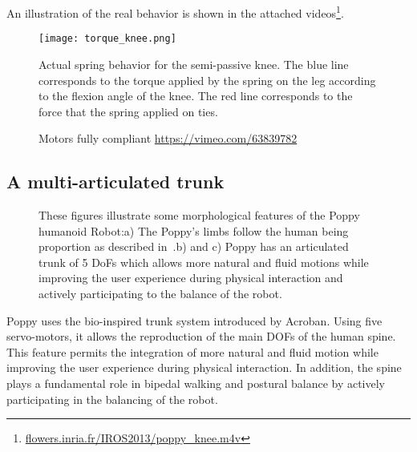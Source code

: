 An illustration of the real behavior is shown in the attached videos\footnote{\url{flowers.inria.fr/IROS2013/poppy_knee.m4v}}.

\begin{figure}[thpb]
    \centering
    \texttt{[image: torque\_knee.png]}
    \caption{Actual spring behavior for the semi-passive knee. The blue line corresponds to the torque applied by the spring on the leg according to the flexion angle of the knee. The red line corresponds to the force that the spring applied on ties.}
    \label{fig:knee_feature}
\end{figure}


\begin{figure}[!h]
\centering
    \hfil
    \caption{Motors fully compliant \url{https://vimeo.com/63839782}}
    \label{fig:}
\end{figure}



\subsection{A multi-articulated trunk} %

\begin{figure}[!t]
\centering
    \hfil
    \caption{These figures illustrate some morphological features of the Poppy humanoid Robot:\newline a) The Poppy's limbs follow the human being proportion as described in~\cite{dufour2005biomecanique}.\newline b) and c) Poppy has an articulated trunk of 5 DoFs which allows more natural and fluid motions while improving the user experience during physical interaction and actively participating to the balance of the robot.}
    \label{fig:poppy_features}
\end{figure}

Poppy uses the bio-inspired trunk system introduced by Acroban. Using five servo-motors, it allows the reproduction of the main DOFs of the human spine. This feature permits the integration of more natural and fluid motion while improving the user experience during physical interaction. In addition, the spine plays a fundamental role in bipedal walking and postural balance by actively participating in the balancing of the robot.


